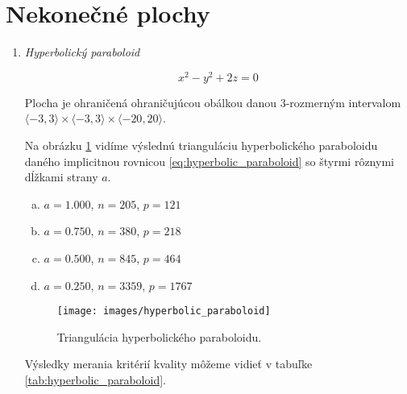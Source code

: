 \section{Nekonečné plochy}
\newpage
\begin{enumerate}
\item{
    \textit{Hyperbolický paraboloid}

    \begin{equation}
    \label{eq:hyperbolic_paraboloid}
        x^2-y^2+2z = 0
    \end{equation}

    Plocha je ohraničená ohraničujúcou obálkou danou $3$-rozmerným intervalom 
    \newline
    \mbox{$\langle -3, 3 \rangle \times \langle -3, 3 \rangle \times \langle -20, 20 \rangle$}.

    Na obrázku \ref{obr:hyperbolic_paraboloid} vidíme výslednú trianguláciu hyperbolického paraboloidu
    daného implicitnou rovnicou \ref{eq:hyperbolic_paraboloid} so štyrmi rôznymi dĺžkami strany $a$.
    \begin{enumerate}[a)]
    \item{
        $a=1.000$, $n=205$, $p=121$
    }
    \item{
        $a=0.750$, $n=380$, $p=218$
    }
    \item{
        $a=0.500$, $n=845$, $p=464$
    }
    \item{
        $a=0.250$, $n=3359$, $p=1767$
    }
    \end{enumerate}

    \begin{figure}
        \centerline{\texttt{[image: images/hyperbolic\_paraboloid]}}
        \caption[Triangulácia hyperbolického paraboloidu]{Triangulácia hyperbolického paraboloidu.}
        \label{obr:hyperbolic_paraboloid}
    \end{figure}

    Výsledky merania kritérií kvality môžeme vidieť v tabuľke \ref{tab:hyperbolic_paraboloid}.

}
\end{enumerate}
